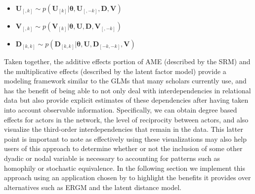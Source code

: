 \begin{itemize}
	\item $\mathbf{U}_{[,k]} \sim p( \mathbf{U}_{[k]} | \bm\theta , \mathbf{U}_{[,-k]}, \mathbf{D}, \mathbf{V} )$
	\item $\mathbf{V}_{[,k]} \sim p( \mathbf{V}_{[k]} | \bm\theta , \mathbf{U}, \mathbf{D}, \mathbf{V}_{[,-k]} )$
	\item $\mathbf{D}_{[k,k]} \sim p( \mathbf{D}_{[k,k]} | \bm\theta , \mathbf{U}, \mathbf{D}_{[-k,-k]}, \mathbf{V} )$
\end{itemize}

Taken together, the additive effects portion of AME (described by the SRM) and the multiplicative effects (described by the latent factor model) provide a modeling framework similar to the GLMs that many scholars currently use, and has the benefit of being able to not only deal with interdependencies in relational data but also provide explicit estimates of these dependencies after having taken into account observable information. Specifically, we can obtain degree based effects for actors in the network, the level of reciprocity between actors, and also visualize the third-order interdependencies that remain in the data. This latter point is important to note as effectively using these visualizations may also help users of this approach to determine whether or not the inclusion of some other dyadic or nodal variable is necessary to accounting for patterns such as homophily or stochastic equivalence. In the following section we implement this approach using an application chosen by \citet{cranmer:etal:2016} to highlight the benefits it provides over alternatives such as ERGM and the latent distance model.



